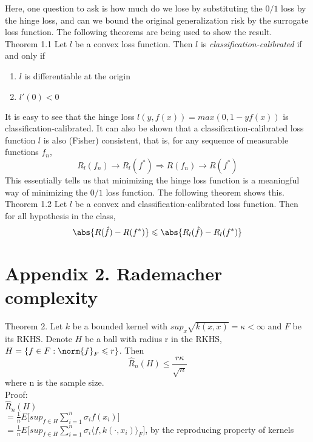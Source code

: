 \documentclass{article}
\begin{document}
Here, one question to ask is how much do we lose by substituting the $0/1$ loss by the hinge loss, and can we bound the original generalization risk by the surrogate loss function. The following theorems are being used to show the result.\\

Theorem 1.1 Let $l$ be a convex loss function. Then $l$ is \textit{classification-calibrated} if and only if 
\begin{enumerate}
  \item $l$ is differentiable at the origin
  \item $l'(0)<0$
\end{enumerate}

It is easy to see that the hinge loss $l(y,f(x))=max(0,1-yf(x))$ is classification-calibrated. It can also be shown that a classification-calibrated loss function $l$ is also (Fisher) consistent, that is, for any sequence of measurable functions $f_n$, $$R_l(f_n) \rightarrow R_l(f^*) \Rightarrow R(f_n) \rightarrow R(f^*)$$ This essentially tells us that minimizing the hinge loss function is a meaningful way of minimizing the $0/1$ loss function. The following theorem shows this. \\

Theorem 1.2 Let $l$ be a convex and classification-calibrated loss function. Then for all hypothesis in the class, $$\abs{R(\hat{f})-R(f^*)} \leqslant \abs{R_{l}(\hat{f})-R_{l}(f^*)}$$


\section*{Appendix 2. Rademacher complexity} 
Theorem 2. Let $k$ be a bounded kernel with $sup_x\sqrt{k(x,x)}=\kappa<\infty$ and $F$ be its RKHS.  Denote $H$ be a ball with radius r in the RKHS, $H=\{f\in F: \norm{f}_F \leqslant r\}$. Then $$\hat{R}_n(H)\leqslant\frac{r\kappa}{\sqrt{n}}$$ where n is the sample size. \\

Proof: \\
$\hat{R}_n(H)$ \\

$= \frac{1}{n}E\Big[sup_{f\in H} \sum_{i=1}^{n} \sigma_{i} f(x_i)\Big]$\\

$= \frac{1}{n}E\Big[sup_{f\in H} \sum_{i=1}^{n} \sigma_{i} \langle f,k(\cdot,x_i) \rangle_{F} \Big]$, by the reproducing property of kernels\\
\end{document}
